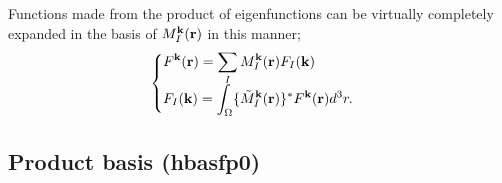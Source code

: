 \documentclass[a4paper,10pt,epsf,fleqn]{article}
\begin{document}
Functions made from the product of eigenfunctions can be
virtually completely expanded in the basis of ${M}^{\bf k}_{I}({\bf r})$
in this manner;
\begin{eqnarray}
\begin{cases}
  \displaystyle 
  F^{\bf k}({\bf r}) = \sum_I M_I^{\bf k} ({\bf r}) F_I({\bf k}) & \cr
  \displaystyle
  F_I({\bf k}) = 
  \int_\Omega \{\tilde{M}_I^{\bf k}({\bf r})\}^* 
  F^{\bf k}({\bf r}) d^3r.
\end{cases}
  \label{expandfk}
\end{eqnarray}


\subsection{Product basis (hbasfp0)}
\label{sec. PB}
\end{document}
